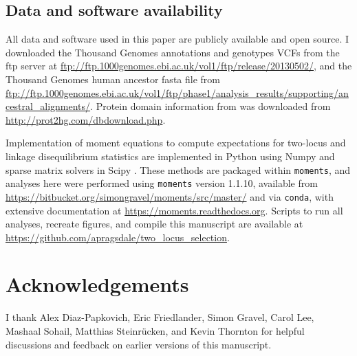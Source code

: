 \documentclass[]{article}
\begin{document}
\subsection{Data and software availability}
\label{data-and-software-availability}

All data and software used in this paper are publicly available and open
source. I downloaded the Thousand Genomes annotations and genotypes VCFs from
the ftp server at
\url{ftp://ftp.1000genomes.ebi.ac.uk/vol1/ftp/release/20130502/}, and the
Thousand Genomes human ancestor fasta file from
\url{ftp://ftp.1000genomes.ebi.ac.uk/vol1/ftp/phase1/analysis_results/supporting/ancestral_alignments/}.
Protein domain information from \citet{Stanek2020-pa} was downloaded from
\url{http://prot2hg.com/dbdownload.php}.

Implementation of moment equations to compute expectations for two-locus and
linkage disequilibrium statistics are implemented in Python using Numpy
\citep{Harris2020-pc} and sparse matrix solvers in Scipy
\citep{Virtanen2020-kr}. These methods are packaged within \texttt{moments},
and analyses here were performed using \texttt{moments} version 1.1.10,
available from \url{https://bitbucket.org/simongravel/moments/src/master/} and
via \texttt{conda}, with extensive documentation at
\url{https://moments.readthedocs.org}. Scripts to run all analyses, recreate
figures, and compile this manuscript are available at
\url{https://github.com/apragsdale/two_locus_selection}.

\section{Acknowledgements}\label{acknowledgements}

I thank Alex Diaz-Papkovich, Eric Friedlander, Simon Gravel, Carol Lee, Mashaal
Sohail, Matthias Steinrücken, and Kevin Thornton for helpful discussions and
feedback on earlier versions of this manuscript.

  

\end{document}
